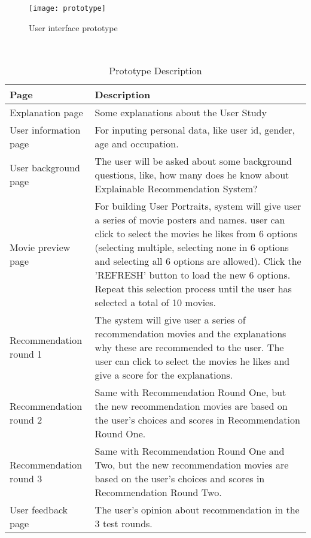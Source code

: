 \begin{figure}[h]
\caption{User interface prototype}
\label{figure:12}
\centering
\texttt{[image: prototype]}
\end{figure}
\leavevmode\\


\begin{table}[h!]
\renewcommand\arraystretch{1.5}
\centering
\begin{tabular}{p{100pt}p{300pt}}\toprule
 \hline
 Page & Description \\ [0.5ex] 
 \hline
  Explanation page & Some explanations about the User Study \\
User information page &  For inputing personal data, like user id, gender, age and occupation.\\
User background page  &  The user will be asked about some background questions, like, how many does he know about Explainable Recommendation System?\\
Movie preview page  &  For building User Portraits, system will give user a series of movie posters and names. user can click to select the movies he likes from 6 options (selecting multiple, selecting none in 6 options and selecting all 6 options are allowed). Click the 'REFRESH' button to load the new 6 options. Repeat this selection process until the user has selected a total of 10 movies. \\
Recommendation round 1  &  The system will give user a series of recommendation movies and the explanations why these are recommended to the user. The user can click to select the movies he likes and give a score for the explanations. \\
Recommendation round 2  &  Same with Recommendation Round One, but the new recommendation movies are based on the user's choices and scores in Recommendation Round One. \\
Recommendation round 3  &  Same with Recommendation Round One and Two, but the new recommendation movies are based on the user's choices and scores in Recommendation Round Two. \\
User feedback page   &  The user's opinion about recommendation in the 3 test rounds.\\
  [1ex] 
 \hline
\end{tabular}
\caption{Prototype Description}
\label{table:1}
\end{table}


\cleardoublepage